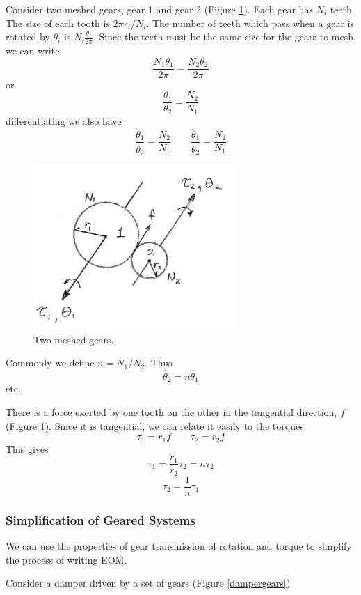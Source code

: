Consider two meshed gears, gear 1 and gear 2 (Figure \ref{2meshedgears}).
Each gear has $N_i$ teeth.
The size of each tooth is $2\pi r_i/ N_i$.  The number of teeth which pass when a gear is rotated by $\theta_i$ is $N_i\frac{\theta_i}{2\pi}$.
Since the teeth must be the same size for the gears to mesh, we can write
\[
\frac{N_1\theta_1}{2\pi} = \frac{N_2\theta_2}{2\pi}
\]
or
\[
\frac {\theta_1}{\theta_2}  =  \frac{N_2}{N_1}
\]
differentiating we also have
\[
\frac { \dot{\theta}_1}{ \dot{\theta_2}}  =  \frac{N_2}{N_1} \qquad
\frac {\ddot{\theta}_1}{\ddot{\theta_2}}  =  \frac{N_2}{N_1}
\]

\begin{figure}\centering
\includegraphics[width=3.0in]{figs03/00744a.png}
\caption{Two meshed gears.}\label{2meshedgears}
\end{figure}

Commonly we define $n  = N_1/N_2$.   Thus
\[
\dot{\theta_2} = n \dot{\theta_1}
\]
etc.


There is a force exerted by one tooth on the other in the tangential direction, $f$ (Figure \ref{2meshedgears}).  Since it is tangential, we can relate it easily to the torques:
\[
\tau_1 = r_1f \qquad \tau_2 = r_2f
\]
This gives
\[
\tau_1 = \frac{r_1}{r_2}\tau_2 = n\tau_2
\]
\[
\tau_2 = \frac{1}{n} \tau_1
\]

\subsubsection{Simplification of Geared Systems}

We can use the properties of gear transmission of rotation and torque to simplify the process of writing EOM.

Consider a damper driven by a set of gears (Figure \ref{dampergears})

